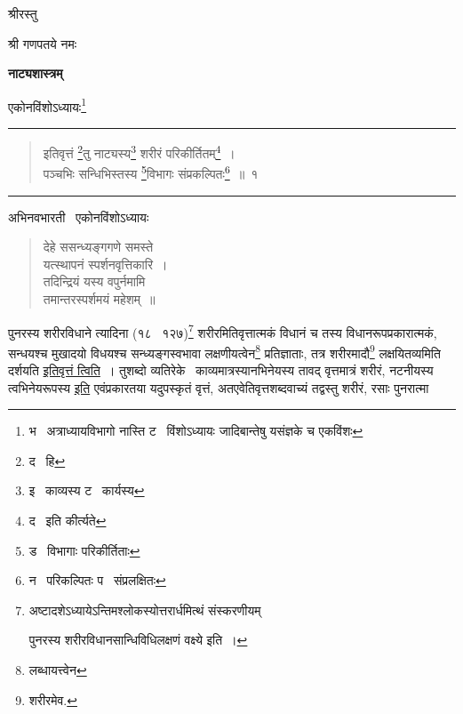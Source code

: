 \documentclass[11pt, openany]{book}
\begin{document}
\newpage
\begin{center}
श्रीरस्तु

\vspace{1mm}
श्री गणपतये नमः

\vspace{4mm}
\textbf{\LARGE नाट्यशास्त्रम्}

\vspace{1mm}
एकोनविंशोऽध्यायः\renewcommand{\thefootnote}{1}\footnote{भ \textendash\ अत्राध्यायविभागो नास्ति ट \textendash\ विंशोऽध्यायः जादिबान्तेषु यसंज्ञके च एकविंशः}

\rule{0.2\linewidth}{0.5pt}
\end{center}

\begin{quote}
{\na इतिवृत्तं \renewcommand{\thefootnote}{2}\footnote{द \textendash\ हि}तु नाट्यस्य\renewcommand{\thefootnote}{3}\footnote{इ \textendash\ काव्यस्य ट \textendash\ कार्यस्य} शरीरं परिकीर्तितम्\renewcommand{\thefootnote}{4}\footnote{द \textendash\ इति कीर्त्यते}~।\\
पञ्चभिः सन्धिभिस्तस्य \renewcommand{\thefootnote}{5}\footnote{ड \textendash\ विभागाः परिकीर्तिताः}विभागः संप्रकल्पितः\renewcommand{\thefootnote}{6}\footnote{न \textendash\ परिकल्पितः प \textendash\ संप्रलक्षितः}~॥~१}
\end{quote}

\hrule

\begin{center}
अभिनवभारती \textendash\ एकोनविंशोऽध्यायः
\end{center}

\begin{quote}
{\qt देहे ससन्ध्यङ्गगणे समस्ते\\
यत्स्थापनं स्पर्शनवृत्तिकारि~।\\
तदिन्द्रियं यस्य वपुर्नमामि\\
तमान्तरस्पर्शमयं महेशम्~॥}
\end{quote}


{\qt पुनरस्य शरीरविधाने} त्यादिना (१८ \textendash\ १२७)\renewcommand{\thefootnote}{*}\footnote{अष्टादशेऽध्यायेऽन्तिमश्लोकस्योत्तरार्धमित्थं संस्करणीयम्\textendash

{\qt पुनरस्य शरीरविधानसान्धिविधिलक्षणं वक्ष्ये} इति~।} शरीरमितिवृत्तात्मकं विधानं च तस्य विधानरूपप्रकारात्मकं, सन्धयश्च मुखादयो विधयश्च सन्ध्यङ्गस्वभावा लक्षणीयत्वेन\renewcommand{\thefootnote}{1}\footnote{लब्धायत्त्वेन} प्रतिज्ञाताः, तत्र शरीरमादौ\renewcommand{\thefootnote}{2}\footnote{शरीरमेव.} लक्षयितव्यमिति दर्शयति \underline{इतिवृत्तं त्विति}~। तुशब्दो व्यतिरेके \textendash\ काव्यमात्रस्यानभिनेयस्य तावद् वृत्तमात्रं शरीरं, नटनीयस्य त्वभिनेयरूपस्य \underline{इति} एवंप्रकारतया यदुपस्कृतं वृत्तं, अतएवेतिवृत्तशब्दवाच्यं तद्वस्तु शरीरं, रसाः पुनरात्मा
\end{document}
